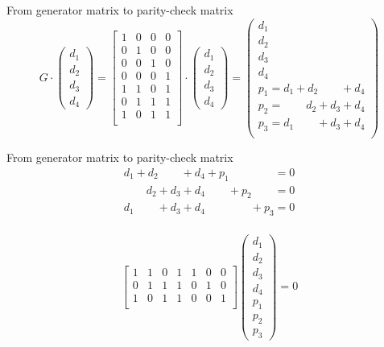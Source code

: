 \begin{frame}{From generator matrix to parity-check matrix}
  \[
	G \cdot \begin{pmatrix}
      d_1 \\ d_2 \\ d_3 \\ d_4
	\end{pmatrix}
	= \begin{bmatrix}
	  1 & 0 & 0 & 0 \\
	  0 & 1 & 0 & 0 \\
	  0 & 0 & 1 & 0 \\
	  0 & 0 & 0 & 1 \\
	  1 & 1 & 0 & 1 \\
	  0 & 1 & 1 & 1 \\
	  1 & 0 & 1 & 1 \\
	\end{bmatrix} 
	\cdot \begin{pmatrix}
      d_1 \\ d_2 \\ d_3 \\ d_4
	\end{pmatrix}
	= \begin{pmatrix}
      d_1 \\ d_2 \\ d_3 \\ d_4 \\
	  p_1 = d_1 + d_2  \qquad + d_4 \\
	  p_2 = \qquad d_2 + d_3 + d_4 \\
	  p_3 = d_1 \qquad + d_3 + d_4 \\
	\end{pmatrix}
  \]
\end{frame}
\begin{frame}{From generator matrix to parity-check matrix}
  \begin{gather*}
	d_1 + d_2  \qquad + d_4 + p_1 \qquad\qquad = 0 \\
	\qquad d_2 + d_3 + d_4 \qquad + p_2 \qquad = 0 \\
	d_1 \qquad + d_3 + d_4 \qquad \qquad + p_3 = 0 \\
  \end{gather*}

  \[
	\begin{bmatrix}
	  1 & 1 & 0 & 1 & 1 & 0 & 0 \\
	  0 & 1 & 1 & 1 & 0 & 1 & 0 \\
	  1 & 0 & 1 & 1 & 0 & 0 & 1 \\
	\end{bmatrix} \begin{pmatrix}
      d_1 \\ d_2 \\ d_3 \\ d_4 \\ p_1 \\ p_2 \\ p_3
	\end{pmatrix}
	= 0
  \]
\end{frame}
